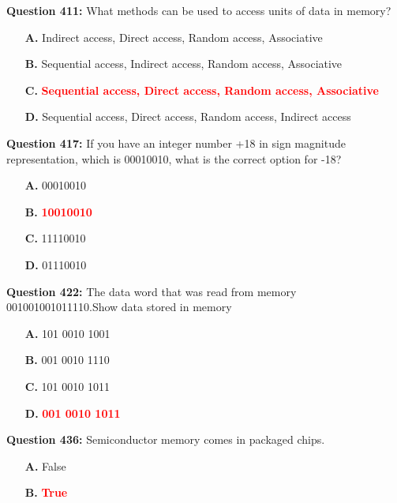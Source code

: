 \documentclass[12pt,a4paper]{article}
\begin{document}
\vspace{0.5cm}

\textbf{Question 411:} What methods can be used to access units of data in memory?

\begin{itemize}
    \item[\textbf{A.}] Indirect access, Direct access, Random access, Associative
    \item[\textbf{B.}] Sequential access, Indirect access, Random access, Associative
    \item[\textbf{C.}] \textcolor{red}{\textbf{Sequential access, Direct access, Random access, Associative}}
    \item[\textbf{D.}] Sequential access, Direct access, Random access, Indirect access
\end{itemize}

\vspace{0.5cm}

\textbf{Question 417:} If you have an integer number +18 in sign magnitude representation, which is 00010010, what is the correct option for -18?

\begin{itemize}
    \item[\textbf{A.}] 00010010
    \item[\textbf{B.}] \textcolor{red}{\textbf{10010010}}
    \item[\textbf{C.}] 11110010
    \item[\textbf{D.}] 01110010
\end{itemize}

\vspace{0.5cm}

\textbf{Question 422:} The data word that was read from memory 001001001011110.Show data stored in memory

\begin{itemize}
    \item[\textbf{A.}] 101 0010 1001
    \item[\textbf{B.}] 001 0010 1110
    \item[\textbf{C.}] 101 0010 1011
    \item[\textbf{D.}] \textcolor{red}{\textbf{001 0010 1011}}
\end{itemize}

\vspace{0.5cm}

\textbf{Question 436:} Semiconductor memory comes in packaged chips.

\begin{itemize}
    \item[\textbf{A.}] False
    \item[\textbf{B.}] \textcolor{red}{\textbf{True}}
\end{itemize}
\end{document}

